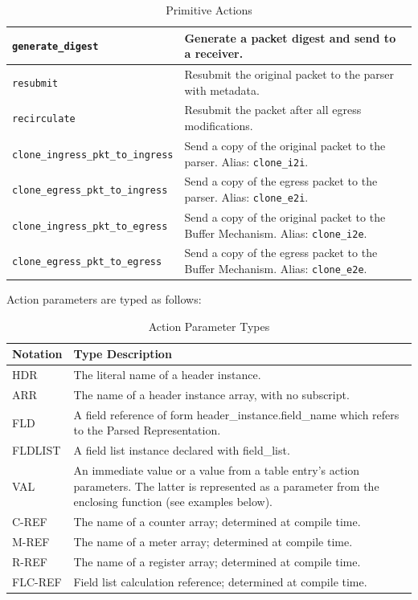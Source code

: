 \documentclass[12pt]{article}
\begin{document}
\begin{table}[H]
\begin{center}
\begin{tabular}{| l | p{} |}
\texttt{generate_digest} &
Generate a packet digest and send to a receiver. \\ \hline
\texttt{resubmit} &
Resubmit the original packet to the parser with metadata. \\ \hline
\texttt{recirculate} &
Resubmit the packet after all egress modifications. \\ \hline
\texttt{clone_ingress_pkt_to_ingress} &
Send a copy of the original packet to the parser. Alias: \texttt{clone_i2i}. \\ \hline
\texttt{clone_egress_pkt_to_ingress} &
Send a copy of the egress packet to the parser. Alias: \texttt{clone_e2i}. \\ \hline
\texttt{clone_ingress_pkt_to_egress} &
Send a copy of the original packet to the Buffer Mechanism. Alias: \texttt{clone_i2e}. \\ \hline
\texttt{clone_egress_pkt_to_egress} &
Send a copy of the egress packet to the Buffer Mechanism. Alias: \texttt{clone_e2e}. \\ \hline
\end{tabular}
\end{center}
\caption{Primitive Actions}
\label{tab:primitiveactions}
\end{table}

Action parameters are typed as follows:

\begin{table}[H]
\begin{center}
\begin{tabular}{| l | p{} |} \hline
\textbf{Notation} &
\textbf{Type Description} \\ \hline
HDR &
The literal name of a header instance. \\ \hline
ARR &
The name of a header instance array, with no subscript. \\ \hline
FLD &
A field reference of form header_instance.field_name which refers to the Parsed Representation. \\ \hline
FLDLIST &
A field list instance declared with field_list. \\ \hline
VAL &
An immediate value or a value from a table entry's action parameters. The latter is represented as a parameter from the enclosing function (see examples below). \\ \hline
C-REF &
The name of a counter array; determined at compile time. \\ \hline
M-REF &
The name of a meter array; determined at compile time. \\ \hline
R-REF &
The name of a register array; determined at compile time. \\ \hline
FLC-REF &
Field list calculation reference; determined at compile time. \\ \hline
\end{tabular}
\end{center}
\caption{Action Parameter Types}
\label{tab:actionparamtypes}
\end{table}
\end{document}
